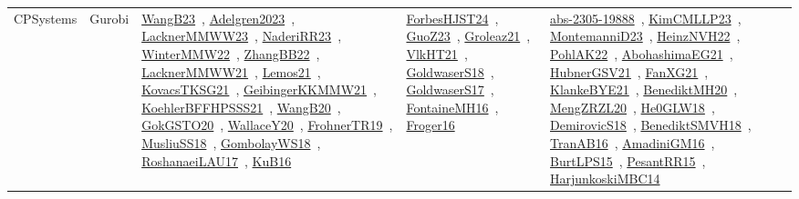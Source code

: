 {\begin{longtable}{lp{3cm}>{\raggedright\arraybackslash}p{6cm}>{\raggedright\arraybackslash}p{6cm}>{\raggedright\arraybackslash}p{8cm}}
CPSystems & Gurobi & \href{../works/WangB23.pdf}{WangB23}~\cite{WangB23}, \href{../works/Adelgren2023.pdf}{Adelgren2023}~\cite{Adelgren2023}, \href{../works/LacknerMMWW23.pdf}{LacknerMMWW23}~\cite{LacknerMMWW23}, \href{../works/NaderiRR23.pdf}{NaderiRR23}~\cite{NaderiRR23}, \href{../works/WinterMMW22.pdf}{WinterMMW22}~\cite{WinterMMW22}, \href{../works/ZhangBB22.pdf}{ZhangBB22}~\cite{ZhangBB22}, \href{../works/LacknerMMWW21.pdf}{LacknerMMWW21}~\cite{LacknerMMWW21}, \href{../works/Lemos21.pdf}{Lemos21}~\cite{Lemos21}, \href{../works/KovacsTKSG21.pdf}{KovacsTKSG21}~\cite{KovacsTKSG21}, \href{../works/GeibingerKKMMW21.pdf}{GeibingerKKMMW21}~\cite{GeibingerKKMMW21}, \href{../works/KoehlerBFFHPSSS21.pdf}{KoehlerBFFHPSSS21}~\cite{KoehlerBFFHPSSS21}, \href{../works/WangB20.pdf}{WangB20}~\cite{WangB20}, \href{../works/GokGSTO20.pdf}{GokGSTO20}~\cite{GokGSTO20}, \href{../works/WallaceY20.pdf}{WallaceY20}~\cite{WallaceY20}, \href{../works/FrohnerTR19.pdf}{FrohnerTR19}~\cite{FrohnerTR19}, \href{../works/MusliuSS18.pdf}{MusliuSS18}~\cite{MusliuSS18}, \href{../works/GombolayWS18.pdf}{GombolayWS18}~\cite{GombolayWS18}, \href{../works/RoshanaeiLAU17.pdf}{RoshanaeiLAU17}~\cite{RoshanaeiLAU17}, \href{../works/KuB16.pdf}{KuB16}~\cite{KuB16} & \href{../works/ForbesHJST24.pdf}{ForbesHJST24}~\cite{ForbesHJST24}, \href{../works/GuoZ23.pdf}{GuoZ23}~\cite{GuoZ23}, \href{../works/Groleaz21.pdf}{Groleaz21}~\cite{Groleaz21}, \href{../works/VlkHT21.pdf}{VlkHT21}~\cite{VlkHT21}, \href{../works/GoldwaserS18.pdf}{GoldwaserS18}~\cite{GoldwaserS18}, \href{../works/GoldwaserS17.pdf}{GoldwaserS17}~\cite{GoldwaserS17}, \href{../works/FontaineMH16.pdf}{FontaineMH16}~\cite{FontaineMH16}, \href{../works/Froger16.pdf}{Froger16}~\cite{Froger16} & \href{../works/abs-2305-19888.pdf}{abs-2305-19888}~\cite{abs-2305-19888}, \href{../works/KimCMLLP23.pdf}{KimCMLLP23}~\cite{KimCMLLP23}, \href{../works/MontemanniD23.pdf}{MontemanniD23}~\cite{MontemanniD23}, \href{../works/HeinzNVH22.pdf}{HeinzNVH22}~\cite{HeinzNVH22}, \href{../works/PohlAK22.pdf}{PohlAK22}~\cite{PohlAK22}, \href{../works/AbohashimaEG21.pdf}{AbohashimaEG21}~\cite{AbohashimaEG21}, \href{../works/HubnerGSV21.pdf}{HubnerGSV21}~\cite{HubnerGSV21}, \href{../works/FanXG21.pdf}{FanXG21}~\cite{FanXG21}, \href{../works/KlankeBYE21.pdf}{KlankeBYE21}~\cite{KlankeBYE21}, \href{../works/BenediktMH20.pdf}{BenediktMH20}~\cite{BenediktMH20}, \href{../works/MengZRZL20.pdf}{MengZRZL20}~\cite{MengZRZL20}, \href{../works/He0GLW18.pdf}{He0GLW18}~\cite{He0GLW18}, \href{../works/DemirovicS18.pdf}{DemirovicS18}~\cite{DemirovicS18}, \href{../works/BenediktSMVH18.pdf}{BenediktSMVH18}~\cite{BenediktSMVH18}, \href{../works/TranAB16.pdf}{TranAB16}~\cite{TranAB16}, \href{../works/AmadiniGM16.pdf}{AmadiniGM16}~\cite{AmadiniGM16}, \href{../works/BurtLPS15.pdf}{BurtLPS15}~\cite{BurtLPS15}, \href{../works/PesantRR15.pdf}{PesantRR15}~\cite{PesantRR15}, \href{../works/HarjunkoskiMBC14.pdf}{HarjunkoskiMBC14}~\cite{HarjunkoskiMBC14}\\

\end{longtable}}
